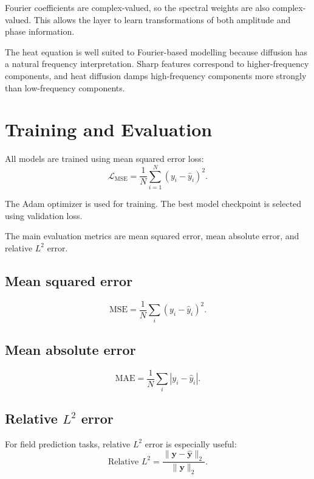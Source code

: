 \documentclass[11pt,a4paper]{article}
\begin{document}
Fourier coefficients are complex-valued, so the spectral weights are also complex-valued. This allows the layer to learn transformations of both amplitude and phase information.

The heat equation is well suited to Fourier-based modelling because diffusion has a natural frequency interpretation. Sharp features correspond to higher-frequency components, and heat diffusion damps high-frequency components more strongly than low-frequency components.

\section{Training and Evaluation}

All models are trained using mean squared error loss:
\begin{equation}
    \mathcal{L}_{\text{MSE}}
    =
    \frac{1}{N}
    \sum_{i=1}^{N}
    (y_i - \hat{y}_i)^2.
\end{equation}

The Adam optimizer is used for training. The best model checkpoint is selected using validation loss.

The main evaluation metrics are mean squared error, mean absolute error, and relative \(L^2\) error.

\subsection{Mean squared error}

\begin{equation}
    \text{MSE}
    =
    \frac{1}{N}
    \sum_i
    (y_i - \hat{y}_i)^2.
\end{equation}

\subsection{Mean absolute error}

\begin{equation}
    \text{MAE}
    =
    \frac{1}{N}
    \sum_i
    |y_i - \hat{y}_i|.
\end{equation}

\subsection{Relative \(L^2\) error}

For field prediction tasks, relative \(L^2\) error is especially useful:
\begin{equation}
    \text{Relative } L^2
    =
    \frac{
    \lVert \bm{y} - \hat{\bm{y}} \rVert_2
    }{
    \lVert \bm{y} \rVert_2
    }.
\end{equation}
\end{document}
